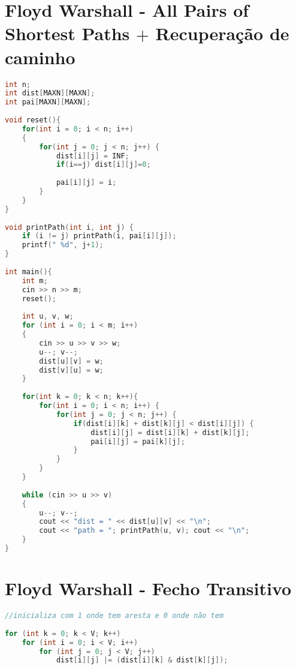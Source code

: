 \documentclass[12pt,a4paper,twoside]{report}
\begin{document}
\section{Floyd Warshall - All Pairs of Shortest Paths $+$ Recuperação de caminho}
\noindent\begin{lstlisting}[caption=Floyd Warshall - All Pairs of Shortest Paths + Recuperação de caminho,language=C++]
int n;
int dist[MAXN][MAXN];
int pai[MAXN][MAXN];
 
void reset(){
    for(int i = 0; i < n; i++)
    {
        for(int j = 0; j < n; j++) {
            dist[i][j] = INF;
            if(i==j) dist[i][j]=0;
             
            pai[i][j] = i;
        }
    }
}
 
void printPath(int i, int j) {
    if (i != j) printPath(i, pai[i][j]);
    printf(" %d", j+1);
}
 
int main(){
    int m;
    cin >> n >> m;
    reset();
     
    int u, v, w;
    for (int i = 0; i < m; i++)
    {
        cin >> u >> v >> w;
        u--; v--;
        dist[u][v] = w;
        dist[v][u] = w;
    }
     
    for(int k = 0; k < n; k++){
        for(int i = 0; i < n; i++) {
            for(int j = 0; j < n; j++) {
                if(dist[i][k] + dist[k][j] < dist[i][j]) {
                    dist[i][j] = dist[i][k] + dist[k][j];
                    pai[i][j] = pai[k][j];
                }
            }
        }
    }
     
    while (cin >> u >> v)
    {
        u--; v--;
        cout << "dist = " << dist[u][v] << "\n";
        cout << "path = "; printPath(u, v); cout << "\n";
    }
}
\end{lstlisting}

\section{Floyd Warshall - Fecho Transitivo}
\noindent\begin{lstlisting}[caption=Floyd Warshall - Fecho Transitivo,language=C++]
//inicializa com 1 onde tem aresta e 0 onde não tem
 
for (int k = 0; k < V; k++)
    for (int i = 0; i < V; i++)
        for (int j = 0; j < V; j++)
            dist[i][j] |= (dist[i][k] & dist[k][j]);
\end{lstlisting}
\end{document}
